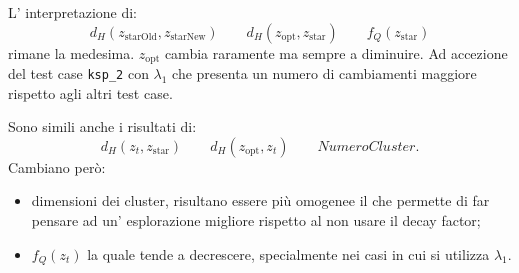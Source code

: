 \documentclass[a4paper,12pt]{article}
\begin{document}
L' interpretazione di:
\[
d_H(z_{\text{starOld}}, z_{\text{starNew}})
\qquad
d_H(z_{\text{opt}}, z_{\text{star}})
\qquad
f_Q(z_{\text{star}})
\]
rimane la medesima. \(z_{\text{opt}}\) cambia raramente ma sempre a diminuire. Ad accezione del test case
\texttt{ksp\_2} con \(\lambda_1\) che presenta un numero di cambiamenti maggiore rispetto agli altri test case.

Sono simili anche i risultati di:
\[
d_H(z_t, z_{\text{star}})
\qquad
d_H(z_{\text{opt}}, z_t)
\qquad 
Numero Cluster.
\]
Cambiano però:
\begin{itemize}
    \item dimensioni dei cluster, risultano essere più omogenee il che permette di far pensare ad un' esplorazione migliore rispetto al non usare il decay factor;
    \item \(f_Q(z_t)\) la quale tende a decrescere, specialmente nei casi in cui si utilizza \(\lambda_1\).
\end{itemize}
\end{document}
